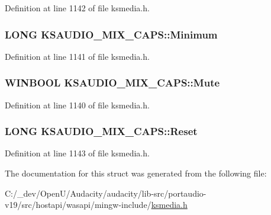 Definition at line 1142 of file ksmedia.\+h.

\subsubsection[{\texorpdfstring{Minimum}{Minimum}}]{\setlength{\rightskip}{0pt plus 5cm}L\+O\+NG K\+S\+A\+U\+D\+I\+O\+\_\+\+M\+I\+X\+\_\+\+C\+A\+P\+S\+::\+Minimum}\hypertarget{struct_k_s_a_u_d_i_o___m_i_x___c_a_p_s_ab40d5db38802d87ef93397a589ca149f}{}\label{struct_k_s_a_u_d_i_o___m_i_x___c_a_p_s_ab40d5db38802d87ef93397a589ca149f}


Definition at line 1141 of file ksmedia.\+h.

\subsubsection[{\texorpdfstring{Mute}{Mute}}]{\setlength{\rightskip}{0pt plus 5cm}W\+I\+N\+B\+O\+OL K\+S\+A\+U\+D\+I\+O\+\_\+\+M\+I\+X\+\_\+\+C\+A\+P\+S\+::\+Mute}\hypertarget{struct_k_s_a_u_d_i_o___m_i_x___c_a_p_s_aa86b0f3f756461f2b71013f163dd0358}{}\label{struct_k_s_a_u_d_i_o___m_i_x___c_a_p_s_aa86b0f3f756461f2b71013f163dd0358}


Definition at line 1140 of file ksmedia.\+h.

\subsubsection[{\texorpdfstring{Reset}{Reset}}]{\setlength{\rightskip}{0pt plus 5cm}L\+O\+NG K\+S\+A\+U\+D\+I\+O\+\_\+\+M\+I\+X\+\_\+\+C\+A\+P\+S\+::\+Reset}\hypertarget{struct_k_s_a_u_d_i_o___m_i_x___c_a_p_s_ac9ce6f4a7cfffab8480f50ba73dfc2fd}{}\label{struct_k_s_a_u_d_i_o___m_i_x___c_a_p_s_ac9ce6f4a7cfffab8480f50ba73dfc2fd}


Definition at line 1143 of file ksmedia.\+h.



The documentation for this struct was generated from the following file\+:\begin{DoxyCompactItemize}
\item 
C\+:/\+\_\+dev/\+Open\+U/\+Audacity/audacity/lib-\/src/portaudio-\/v19/src/hostapi/wasapi/mingw-\/include/\hyperlink{ksmedia_8h}{ksmedia.\+h}\end{DoxyCompactItemize}
